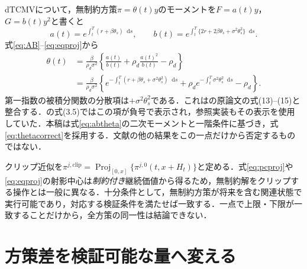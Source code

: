 \documentclass[10pt,a4paper]{article}
\numberwithin{equation}{section}
\numberwithin{table}{section}
\numberwithin{figure}{section}
\theoremstyle{plain}
\theoremstyle{definition}
\DeclareMathOperator{\Proj}{Proj}
\newcommand{\dd}{\mathop{}\!\mathrm{d}}
\begin{document}
dTCMVについて，無制約方策$\pi=\theta(t)y$のモーメントを$F=a(t)y$，$G=b(t)y^2$と書くと
\begin{equation}
a(t)=e^{\int_t^T(r+\beta\theta_s)\dd s},\qquad
b(t)=e^{\int_t^T\{2r+2\beta\theta_s+\sigma^2\theta_s^2\}\dd s}.
\label{eq:abtheta}
\end{equation}
式\eqref{eq:AB}--\eqref{eq:eqproj}から
\begin{align}
\theta(t)&=\frac\beta{\rho_d\sigma^2}\left\{\frac{a(t)}{b(t)}+
\rho_d\frac{a(t)^2}{b(t)}-\rho_d\right\}\label{eq:thetamon}\\
&=\frac\beta{\rho_d\sigma^2}\left\{
e^{-\int_t^T(r+\beta\theta_s+\sigma^2\theta_s^2)\dd s}
+\rho_d e^{-\int_t^T\sigma^2\theta_s^2\dd s}-\rho_d\right\}.
\label{eq:thetacorrect}
\end{align}
第一指数の被積分関数の分散項は\textbf{$+\sigma^2\theta_s^2$}である．これは\citet{BjorkMurgociZhou2014}の原論文の式(13)--(15)と整合する．\citet{vanStadenDangForsyth2021}の式(3.5)ではこの項が負号で表示され，参照実装もその表示を使用していた．本稿は式\eqref{eq:abtheta}の二次モーメントと一階条件に基づき，式\eqref{eq:thetacorrect}を採用する．文献の他の結果をこの一点だけから否定するものではない．

クリップ近似を$\pi^{j,\mathrm{clip}}=\Proj_{[0,x]}\{\pi^{j,0}(t,x+H_t)\}$と定める．式\eqref{eq:pcproj}や\eqref{eq:eqproj}の射影中心は\emph{制約付き}継続価値から得るため，無制約解をクリップする操作とは一般に異なる．十分条件として，無制約方策が将来を含む関連状態で実行可能であり，対応する検証条件を満たせば一致する．一点で上限・下限が一致することだけから，全方策の同一性は結論できない．

\section{方策差を検証可能な量へ変える}
\label{sec:cert}
\end{document}
